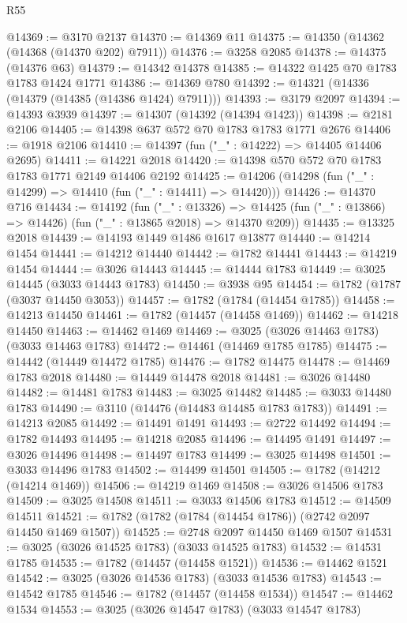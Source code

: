 \begin{lexlean}{R55}
\begin{coremodule}
@14369 := @3170 @2137
@14370 := @14369 @11
@14375 := @14350 (@14362 (@14368 (@14370 @202) @7911))
@14376 := @3258 @2085
@14378 := @14375 (@14376 @63)
@14379 := @14342 @14378
@14385 := @14322 @1425 @70 @1783 @1783 @1424 @1771
@14386 := @14369 @780
@14392 := @14321 (@14336 (@14379 (@14385 (@14386 @1424) @7911)))
@14393 := @3179 @2097
@14394 := @14393 @3939
@14397 := @14307 (@14392 (@14394 @1423))
@14398 := @2181 @2106
@14405 := @14398 @637 @572 @70 @1783 @1783 @1771 @2676
@14406 := @1918 @2106
@14410 := @14397 (fun ("_" : @14222) => @14405 @14406 @2695)
@14411 := @14221 @2018
@14420 := @14398 @570 @572 @70 @1783 @1783 @1771 @2149 @14406 @2192
@14425 := @14206 (@14298 (fun ("_" : @14299) => @14410 (fun ("_" : @14411) => @14420)))
@14426 := @14370 @716
@14434 := @14192
    (fun ("_" : @13326) =>
    @14425 (fun ("_" : @13866) => @14426) (fun ("_" : @13865 @2018) => @14370 @209))
@14435 := @13325 @2018
@14439 := @14193 @1449 @1486 @1617 @13877
@14440 := @14214 @1454
@14441 := @14212 @14440
@14442 := @1782 @14441
@14443 := @14219 @1454
@14444 := @3026 @14443
@14445 := @14444 @1783
@14449 := @3025 @14445 (@3033 @14443 @1783)
@14450 := @3938 @95
@14454 := @1782 (@1787 (@3037 @14450 @3053))
@14457 := @1782 (@1784 (@14454 @1785))
@14458 := @14213 @14450
@14461 := @1782 (@14457 (@14458 @1469))
@14462 := @14218 @14450
@14463 := @14462 @1469
@14469 := @3025 (@3026 @14463 @1783) (@3033 @14463 @1783)
@14472 := @14461 (@14469 @1785 @1785)
@14475 := @14442 (@14449 @14472 @1785)
@14476 := @1782 @14475
@14478 := @14469 @1783 @2018
@14480 := @14449 @14478 @2018
@14481 := @3026 @14480
@14482 := @14481 @1783
@14483 := @3025 @14482
@14485 := @3033 @14480 @1783
@14490 := @3110 (@14476 (@14483 @14485 @1783 @1783))
@14491 := @14213 @2085
@14492 := @14491 @1491
@14493 := @2722 @14492
@14494 := @1782 @14493
@14495 := @14218 @2085
@14496 := @14495 @1491
@14497 := @3026 @14496
@14498 := @14497 @1783
@14499 := @3025 @14498
@14501 := @3033 @14496 @1783
@14502 := @14499 @14501
@14505 := @1782 (@14212 (@14214 @1469))
@14506 := @14219 @1469
@14508 := @3026 @14506 @1783
@14509 := @3025 @14508
@14511 := @3033 @14506 @1783
@14512 := @14509 @14511
@14521 := @1782 (@1782 (@1784 (@14454 @1786)) (@2742 @2097 @14450 @1469 @1507))
@14525 := @2748 @2097 @14450 @1469 @1507
@14531 := @3025 (@3026 @14525 @1783) (@3033 @14525 @1783)
@14532 := @14531 @1785
@14535 := @1782 (@14457 (@14458 @1521))
@14536 := @14462 @1521
@14542 := @3025 (@3026 @14536 @1783) (@3033 @14536 @1783)
@14543 := @14542 @1785
@14546 := @1782 (@14457 (@14458 @1534))
@14547 := @14462 @1534
@14553 := @3025 (@3026 @14547 @1783) (@3033 @14547 @1783)

\end{coremodule}
\end{lexlean}
